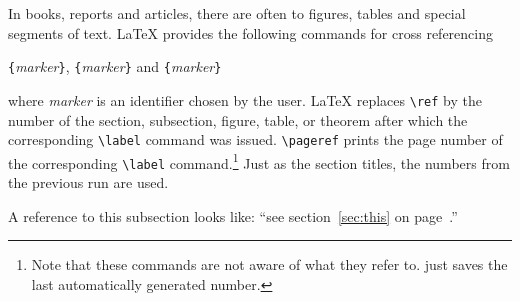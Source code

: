 In books, reports and articles, there are often 
 to figures, tables and special segments of text.
\LaTeX{} provides the following commands for cross referencing
\begin{command}
\verb|{|\emph{marker}\verb|}|, \verb|{|\emph{marker}\verb|}| 
and \verb|{|\emph{marker}\verb|}|
\end{command}
\noindent where \emph{marker} is an identifier chosen by the user. \LaTeX{}
replaces \verb|\ref| by the number of the section, subsection, figure,
table, or theorem after which the corresponding \verb|\label| command
was issued. \verb|\pageref| prints the page number of the
corresponding \verb|\label| command.\footnote{Note that these commands
  are not aware of what they refer to.  just saves the last
  automatically generated number.} Just as the section titles, the
numbers from the previous run are used.

\begin{example}
A reference to this subsection
\label{sec:this} looks like:
``see section~\ref{sec:this} on 
page~\pageref{sec:this}.''
\end{example}
 

 



